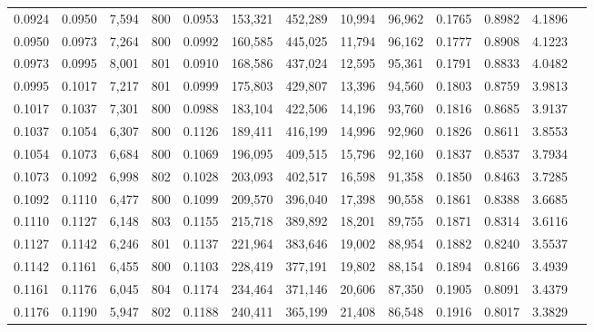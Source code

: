 \begin{tabular}{rrrrrrrrrrrrr}
0.0924 & 0.0950 &  7,594 & 800 &                                     0.0953 & 153,321 & 452,289 &  10,994 &  96,962 & 0.1765 & 0.8982 & 4.1896 \\
0.0950 & 0.0973 &  7,264 & 800 &                                     0.0992 & 160,585 & 445,025 &  11,794 &  96,162 & 0.1777 & 0.8908 & 4.1223 \\
0.0973 & 0.0995 &  8,001 & 801 &                                     0.0910 & 168,586 & 437,024 &  12,595 &  95,361 & 0.1791 & 0.8833 & 4.0482 \\
0.0995 & 0.1017 &  7,217 & 801 &                                     0.0999 & 175,803 & 429,807 &  13,396 &  94,560 & 0.1803 & 0.8759 & 3.9813 \\
0.1017 & 0.1037 &  7,301 & 800 &                                     0.0988 & 183,104 & 422,506 &  14,196 &  93,760 & 0.1816 & 0.8685 & 3.9137 \\
0.1037 & 0.1054 &  6,307 & 800 &                                     0.1126 & 189,411 & 416,199 &  14,996 &  92,960 & 0.1826 & 0.8611 & 3.8553 \\
0.1054 & 0.1073 &  6,684 & 800 &                                     0.1069 & 196,095 & 409,515 &  15,796 &  92,160 & 0.1837 & 0.8537 & 3.7934 \\
0.1073 & 0.1092 &  6,998 & 802 &                                     0.1028 & 203,093 & 402,517 &  16,598 &  91,358 & 0.1850 & 0.8463 & 3.7285 \\
0.1092 & 0.1110 &  6,477 & 800 &                                     0.1099 & 209,570 & 396,040 &  17,398 &  90,558 & 0.1861 & 0.8388 & 3.6685 \\
0.1110 & 0.1127 &  6,148 & 803 &                                     0.1155 & 215,718 & 389,892 &  18,201 &  89,755 & 0.1871 & 0.8314 & 3.6116 \\
0.1127 & 0.1142 &  6,246 & 801 &                                     0.1137 & 221,964 & 383,646 &  19,002 &  88,954 & 0.1882 & 0.8240 & 3.5537 \\
0.1142 & 0.1161 &  6,455 & 800 &                                     0.1103 & 228,419 & 377,191 &  19,802 &  88,154 & 0.1894 & 0.8166 & 3.4939 \\
0.1161 & 0.1176 &  6,045 & 804 &                                     0.1174 & 234,464 & 371,146 &  20,606 &  87,350 & 0.1905 & 0.8091 & 3.4379 \\
0.1176 & 0.1190 &  5,947 & 802 &                                     0.1188 & 240,411 & 365,199 &  21,408 &  86,548 & 0.1916 & 0.8017 & 3.3829 \\

\end{tabular}
